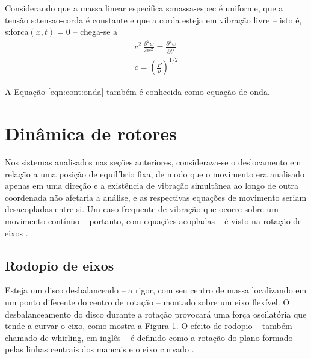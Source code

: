 \documentclass[12pt,oneside,english,brazil]{ucsmono}
\begin{document}
	Considerando que a massa linear específica \gls{s:massa-espec} é uniforme, que a tensão \gls{s:tensao-corda} é constante e que a corda esteja em vibração livre -- isto é, \gls{s:forca}$(x,t) = 0$ -- chega-se a \cite{rao:2008}
	\begin{align}
		\mathit{c}^2\:\frac{\partial^2 w}{\partial x^2}=\frac{\partial^2 w}{\partial t^2} \label{eqn:cont:onda}\\
		\mathit{c} = \left(\frac{P}{\rho}\right)^{1/2}
	\end{align}
	
	A Equação \ref{eqn:cont:onda} também é conhecida como equação de onda. 
	
	\section{Dinâmica de rotores}
	Nos sistemas analisados nas seções anteriores, considerava-se o deslocamento em relação a uma posição de equilíbrio fixa, de modo que o movimento era analisado apenas em uma direção e a existência de vibração simultânea ao longo de outra coordenada não afetaria a análise, e as respectivas equações de movimento seriam desacopladas entre si. Um caso frequente de vibração que ocorre sobre um movimento contínuo -- portanto, com equações acopladas -- é visto na rotação de eixos \cite{dimarogonas:1995}.

	\subsection{Rodopio de eixos}
	Esteja um disco desbalanceado -- a rigor, com seu centro de massa localizando em um ponto diferente do centro de rotação -- montado sobre um eixo flexível. O desbalanceamento do disco durante a rotação provocará uma força oscilatória que tende a curvar o eixo, como mostra a Figura \ref{fig:whirl-eixo}. O efeito de rodopio -- também chamado de \foreignlanguage{english}{whirling}, em inglês -- é definido como a rotação do plano formado pelas linhas centrais dos mancais e o eixo curvado \cite{rao:2008}.
	\begin{figure}[b]
		\label{fig:whirl-eixo}
	\end{figure}
\end{document}
